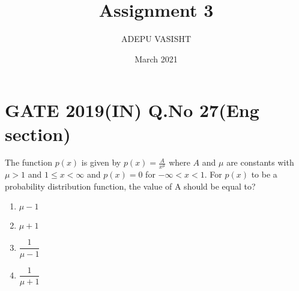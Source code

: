 \documentclass[journal,12pt,twocolumn]{IEEEtran}
\title{Assignment 3}
\author{ADEPU VASISHT}
\date{March 2021}
\providecommand{\brak}[1]{\ensuremath{\left(#1\right)}}
\begin{document}
\maketitle

\section*{GATE 2019(IN) Q.No 27(Eng section)}
The function $p\brak{x}$ is given by $p\brak{x} = \frac{A}{x^\mu}$ where $A$ and $\mu$ are constants with $\mu>1$ and $1\leq x<\infty$ and $p\brak{x}= 0$ for $-\infty<x<1$. For $p\brak{x}$ to be a probability distribution function, the value of A should be equal to?

\begin{enumerate}
\item$\mu -1$\\
\item$\mu+1$\\
\item$\dfrac{1}{\mu-1}$\\
\item$\dfrac{1}{\mu+1}$\\
\end{enumerate}
\end{document}
